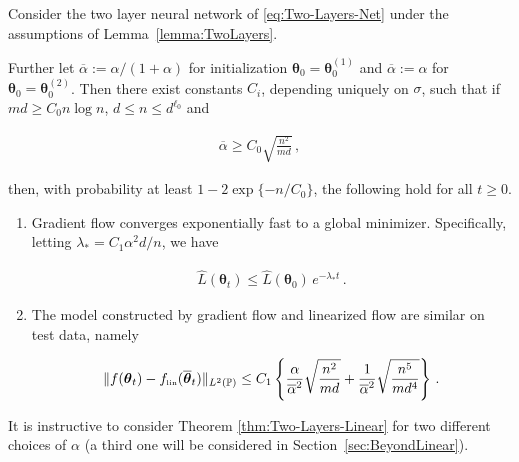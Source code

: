   \begin{theorem}\label{thm:Two-Layers-Linear}
    Consider the two layer neural network of \eqref{eq:Two-Layers-Net}
  under the assumptions of Lemma~\ref{lemma:TwoLayers}.

  Further let $\overline{\alpha} :=\alpha/(1+\alpha)$ for initialization ${\boldsymbol \theta}_0={\boldsymbol \theta}_0^{(1)}$ and
  $\overline{\alpha} :=\alpha$ for ${\boldsymbol \theta}_0={\boldsymbol \theta}_0^{(2)}$.
  Then there exist constants $C_i$, depending uniquely on $\sigma$, such that if $md\ge C_0 n\log n$, $d\le n\le d^{\ell_0}$ and

  \begin{align}
    \overline{\alpha}\ge C_0 \sqrt{\frac{n^2}{md}}\,
    ,\label{eq:ConditionLinearization2}
  \end{align}

  then, with probability at least $1-2\exp\{-n/C_0\}$,
  the following hold for all $t\ge 0$.

  \begin{enumerate}
  \item Gradient flow converges exponentially fast to a global minimizer. Specifically, letting
    $\lambda_* = C_1\alpha^2d/n$, we have

    \begin{align}
      \widehat{L}({\boldsymbol \theta}_t)\le \widehat{L}({\boldsymbol \theta}_0) \, e^{-\lambda_* t}\, .\label{eq:TrainingConvergence}
    \end{align}

  \item The model constructed by gradient flow and linearized flow are similar on test data, namely

    \begin{align}
      \|f({\boldsymbol \theta}_t) -f_{\mbox{\rm\tiny lin}}(\overline{\boldsymbol \theta}_t)\|_{L^2(\mathbb{P})}\le C_1\left\{\frac{\alpha}{\overline{\alpha}^2}\sqrt{\frac{n^2}{md}} +\frac{1}{\overline{\alpha}^2}
      \sqrt{\frac{n^5}{md^4}}\right\}\, .\label{eq:ModelDistanceLin}
      \end{align}
  \end{enumerate}
\end{theorem}

It is instructive to consider Theorem \ref{thm:Two-Layers-Linear} for two different choices of $\alpha$ (a third one will be considered in
Section~\ref{sec:BeyondLinear}).

